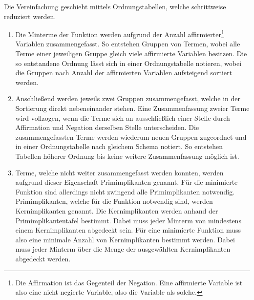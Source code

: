 Die Vereinfachung geschieht mittels Ordnungstabellen, welche schrittweise reduziert werden. 
\begin{enumerate}
  \item Die Minterme der Funktion werden aufgrund der Anzahl affirmierter\footnote{Die Affirmation ist das Gegenteil der Negation. Eine affirmierte Variable ist also eine nicht negierte Variable, also die Variable als solche.} Variablen zusammengefasst. So entstehen Gruppen von Termen, wobei alle Terme einer jeweiligen Gruppe gleich viele affirmierte Variablen besitzen. Die so entstandene Ordnung lässt sich in einer Ordnungstabelle notieren, wobei die Gruppen nach Anzahl der affirmierten Variablen aufsteigend sortiert werden.
  \item Anschließend werden jeweils zwei Gruppen zusammengefasst, welche in der Sortierung direkt nebeneinander stehen. Eine Zusammenfassung zweier Terme wird vollzogen, wenn die Terme sich an ausschließlich einer Stelle durch Affirmation und Negation derselben Stelle unterscheiden. Die zusammengefassten Terme werden wiederum neuen Gruppen zugeordnet und in einer Ordnungstabelle nach gleichem Schema notiert. So entstehen Tabellen höherer Ordnung bis keine weitere Zusammenfassung möglich ist.
  \item Terme, welche nicht weiter zusammengefasst werden konnten, werden aufgrund dieser Eigenschaft Primimplikanten genannt. Für die minimierte Funktion sind allerdings nicht zwingend alle Primimplikanten notwendig. Primimplikanten, welche für die Funktion notwendig sind, werden Kernimplikanten genannt. Die Kernimplikanten werden anhand der Primimplikantentafel bestimmt. Dabei muss jeder Minterm von mindestens einem Kernimplikanten abgedeckt sein. Für eine minimierte Funktion muss also eine minimale Anzahl von Kernimplikanten bestimmt werden. Dabei muss jeder Minterm über die Menge der ausgewählten Kernimplikanten abgedeckt werden.
\end{enumerate}

